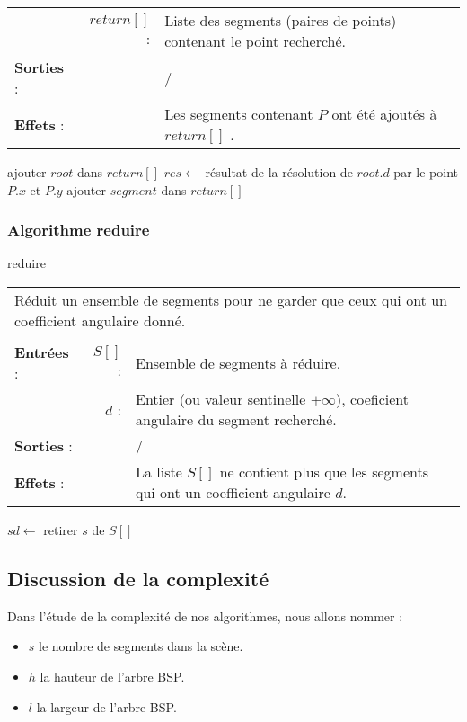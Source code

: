 \documentclass[10pt]{article}
\begin{document}
\begin{algorithm}[H]
\begin{tabular}{lrl}
&$return[]$ :&Liste des segments (paires de points) contenant le point recherché.\\
\textbf{Sorties} :& &/\\
\textbf{Effets} :& &Les segments contenant $P$ ont été ajoutés à $return[]$ .
\end{tabular}
\begin{algorithmic}[1]
\State ajouter $root$ dans $return[]$
\EndIf
\Else
\State $res\gets$ résultat de la résolution de $root.d$ par le point $P.x$ et $P.y$
\State {}
\State {}
\Else
{}
\State ajouter $segment$ dans $return[]$
\EndIf
\EndFor
\State{}
\State{}
\EndIf
\EndIf
\EndProcedure
\end{algorithmic}
\end{algorithm}

\subsubsection{Algorithme reduire}
\begin{algorithm}[H]
\caption{reduire}
\begin{tabular}{lrl}
\multicolumn{3}{l}{Réduit un ensemble de segments pour ne garder que ceux qui ont un coefficient angulaire donné.}\\
&&\\
\textbf{Entrées} : &$S[]$ : &Ensemble de segments à réduire.\\
& $d$ : &Entier (ou valeur sentinelle $+\infty$), coeficient angulaire du segment recherché.\\
\textbf{Sorties} :& &/\\
\textbf{Effets} :& &La liste $S[]$ ne contient plus que les segments qui ont un coefficient angulaire $d$.
\end{tabular}
\begin{algorithmic}[1]
\State $sd\gets$
\State retirer $s$ de $S[]$
\EndIf
\EndFor
\EndProcedure
\end{algorithmic}
\end{algorithm}

\newpage
\subsection{Discussion de la complexité}
Dans l'étude de la complexité de nos algorithmes, nous allons nommer :
\begin{itemize}
\item $s$ le nombre de segments dans la scène.
\item $h$ la hauteur de l'arbre BSP.
\item $l$ la largeur de l'arbre BSP.
\end{itemize}
\end{document}
